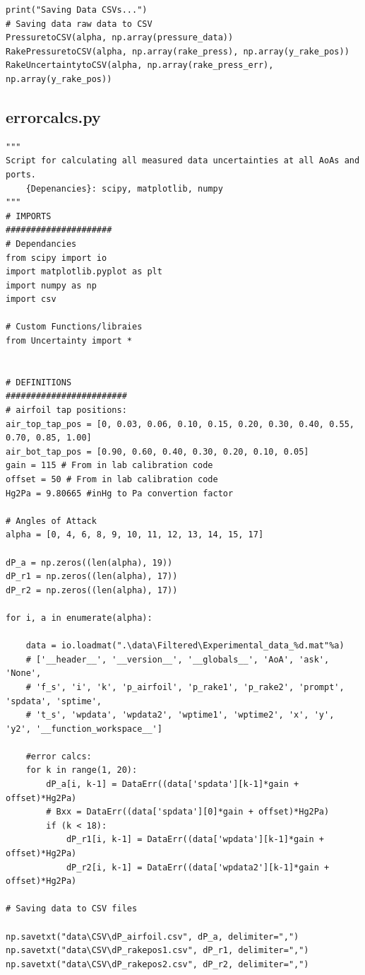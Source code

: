 \documentclass[11pt, letterpaper]{article}
\begin{document}
\begin{appendices}
\begin{verbatim}
print("Saving Data CSVs...")
# Saving data raw data to CSV
PressuretoCSV(alpha, np.array(pressure_data))
RakePressuretoCSV(alpha, np.array(rake_press), np.array(y_rake_pos))
RakeUncertaintytoCSV(alpha, np.array(rake_press_err), np.array(y_rake_pos))
\end{verbatim}

\subsection{errorcalcs.py}
\begin{verbatim}
"""
Script for calculating all measured data uncertainties at all AoAs and ports.
    {Depenancies}: scipy, matplotlib, numpy
"""
# IMPORTS
#####################
# Dependancies
from scipy import io
import matplotlib.pyplot as plt
import numpy as np
import csv

# Custom Functions/libraies
from Uncertainty import *


# DEFINITIONS
########################
# airfoil tap positions: 
air_top_tap_pos = [0, 0.03, 0.06, 0.10, 0.15, 0.20, 0.30, 0.40, 0.55, 0.70, 0.85, 1.00]
air_bot_tap_pos = [0.90, 0.60, 0.40, 0.30, 0.20, 0.10, 0.05]
gain = 115 # From in lab calibration code
offset = 50 # From in lab calibration code
Hg2Pa = 9.80665 #inHg to Pa convertion factor

# Angles of Attack
alpha = [0, 4, 6, 8, 9, 10, 11, 12, 13, 14, 15, 17]

dP_a = np.zeros((len(alpha), 19))
dP_r1 = np.zeros((len(alpha), 17))
dP_r2 = np.zeros((len(alpha), 17))

for i, a in enumerate(alpha):

    data = io.loadmat(".\data\Filtered\Experimental_data_%d.mat"%a)
    # ['__header__', '__version__', '__globals__', 'AoA', 'ask', 'None', 
    # 'f_s', 'i', 'k', 'p_airfoil', 'p_rake1', 'p_rake2', 'prompt', 'spdata', 'sptime', 
    # 't_s', 'wpdata', 'wpdata2', 'wptime1', 'wptime2', 'x', 'y', 'y2', '__function_workspace__']

    #error calcs:
    for k in range(1, 20):
        dP_a[i, k-1] = DataErr((data['spdata'][k-1]*gain + offset)*Hg2Pa)
        # Bxx = DataErr((data['spdata'][0]*gain + offset)*Hg2Pa)
        if (k < 18):
            dP_r1[i, k-1] = DataErr((data['wpdata'][k-1]*gain + offset)*Hg2Pa)
            dP_r2[i, k-1] = DataErr((data['wpdata2'][k-1]*gain + offset)*Hg2Pa)

# Saving data to CSV files

np.savetxt("data\CSV\dP_airfoil.csv", dP_a, delimiter=",")
np.savetxt("data\CSV\dP_rakepos1.csv", dP_r1, delimiter=",")
np.savetxt("data\CSV\dP_rakepos2.csv", dP_r2, delimiter=",")
\end{verbatim}

\end{appendices}
\end{document}
